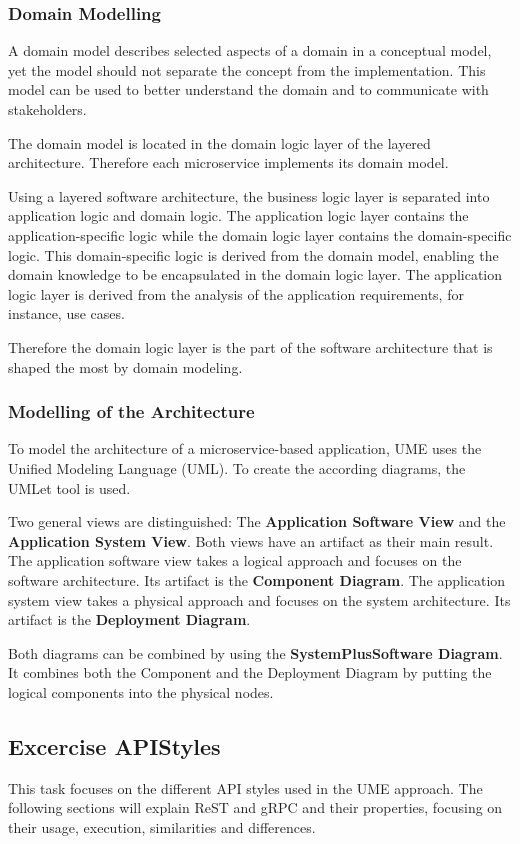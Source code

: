 \subsubsection*{Domain Modelling}
A domain model describes selected aspects of a domain in a conceptual model, yet the model should not separate the concept from the implementation.
This model can be used to better understand the domain and to communicate with stakeholders.

The domain model is located in the domain logic layer of the layered architecture.
Therefore each microservice implements its domain model.

Using a layered software architecture, the business logic layer is separated into application logic and domain logic.
The application logic layer contains the application-specific logic while the domain logic layer contains the domain-specific logic.
This domain-specific logic is derived from the domain model, enabling the domain knowledge to be encapsulated in the domain logic layer.
The application logic layer is derived from the analysis of the application requirements, for instance, use cases.

Therefore the domain logic layer is the part of the software architecture that is shaped the most by domain modeling.

\subsubsection*{Modelling of the Architecture}
To model the architecture of a microservice-based application, UME uses the Unified Modeling Language (UML).
To create the according diagrams, the UMLet tool \cite{UML-WEB} is used.

Two general views are distinguished: The \textbf{Application Software View} and the \textbf{Application System View}.
Both views have an artifact as their main result.
The application software view takes a logical approach and focuses on the software architecture.
Its artifact is the \textbf{Component Diagram}.
The application system view takes a physical approach and focuses on the system architecture.
Its artifact is the \textbf{Deployment Diagram}.

Both diagrams can be combined by using the \textbf{SystemPlusSoftware Diagram}.
It combines both the Component and the Deployment Diagram by putting the logical components into the physical nodes.

\subsection{Excercise APIStyles}
\label{sec:api_styles}
This task focuses on the different API styles used in the UME approach.
The following sections will explain ReST and gRPC and their properties, focusing on their usage, execution, similarities and differences.

